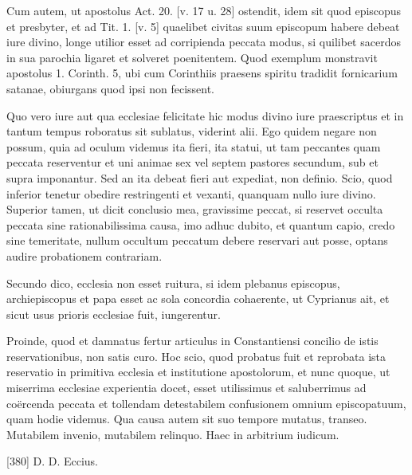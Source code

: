 Cum autem, ut apostolus Act. 20. [v. 17 u. 28] ostendit, idem sit quod episcopus et presbyter, et ad Tit. 1. [v. 5] quaelibet civitas suum episcopum habere debeat iure divino, longe utilior esset ad corripienda peccata modus, si quilibet sacerdos in sua parochia ligaret et solveret poenitentem. Quod exemplum monstravit apostolus 1. Corinth. 5, ubi cum Corinthiis praesens spiritu tradidit fornicarium satanae, obiurgans quod ipsi non fecissent.

Quo vero iure aut qua ecclesiae felicitate hic modus divino iure praescriptus et in tantum tempus roboratus sit sublatus, viderint alii. Ego quidem negare non possum, quia ad oculum videmus ita fieri, ita statui, ut tam peccantes quam peccata reserventur et uni animae sex vel septem pastores secundum, sub et supra imponantur. Sed an ita debeat fieri aut expediat, non definio. Scio, quod inferior tenetur obedire restringenti et vexanti, quanquam nullo iure divino. Superior tamen, ut dicit conclusio mea, gravissime peccat, si reservet occulta peccata sine rationabilissima causa, imo adhuc dubito, et quantum capio, credo sine temeritate, nullum occultum peccatum debere reservari aut posse, optans audire probationem contrariam.

Secundo dico, ecclesia non esset ruitura, si idem plebanus episcopus, archiepiscopus et papa esset ac sola concordia cohaerente, ut Cyprianus ait, et sicut usus prioris ecclesiae fuit, iungerentur.

Proinde, quod et damnatus fertur articulus in Constantiensi concilio de istis reservationibus, non satis curo. Hoc scio, quod probatus fuit et reprobata ista reservatio in primitiva ecclesia et institutione apostolorum, et nunc quoque, ut miserrima ecclesiae experientia docet, esset utilissimus et saluberrimus ad coërcenda peccata et tollendam detestabilem confusionem omnium episcopatuum, quam hodie videmus. Qua causa autem sit suo tempore mutatus, transeo. Mutabilem invenio, mutabilem relinquo. Haec in arbitrium iudicum.

[380] D. D. Eccius.

